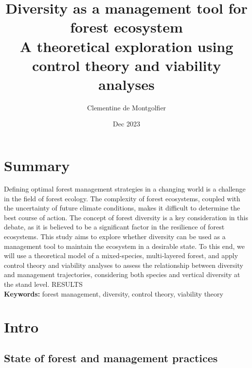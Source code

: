 \documentclass{article}
\title{Diversity as a management tool for forest ecosystem \\ 
\large A theoretical exploration using control theory and viability analyses}
\author{Clementine de Montgolfier}
\date{Dec 2023}
\begin{document}
\maketitle

\section{Summary}

Defining optimal forest management strategies in a changing world is a challenge in the field of forest ecology. The complexity of forest ecosystems, coupled with the uncertainty of future climate conditions, makes it difficult to determine the best course of action. The concept of forest diversity is a key consideration in this debate, as it is believed to be a significant factor in the resilience of forest ecosystems. This study aims to explore whether diversity can be used as a management tool to maintain the ecosystem in a desirable state. To this end, we will use a theoretical model of a mixed-species, multi-layered forest, and apply control theory and viability analyses to assess the relationship between diversity and management trajectories, considering both species and vertical diversity at the stand level. RESULTS\\

\noindent \textbf{Keywords:} forest management, diversity, control theory, viability theory

\section{Intro}

\subsection{State of forest and management practices}
\end{document}
